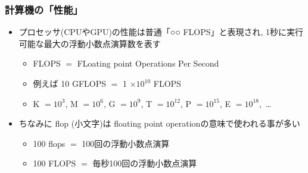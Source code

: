 \documentclass[10pt,dvipdfmx]{beamer}
\newcommand{\ao}[1]{{\color{blue}#1}}
\begin{document}
\begin{frame}
  \frametitle{計算機の「性能」}
  \begin{itemize}
  \item<1-> プロセッサ(CPUやGPU)の性能は普通\ao{「○○ FLOPS」}と表現され,
    1秒に実行可能な最大の\ao{浮動小数点演算数}を表す
    \begin{itemize}
    \item<2-> \ao{FLOPS} $=$ \ao{FL}oating point \ao{O}perations
      \ao{P}er \ao{S}econd
    \item<3-> 例えば 10 GFLOPS $=$ 1 $\times 10^{10}$ FLOPS
    \item<3->
      K $= 10^3$,
      M $= 10^6$,
      G $= 10^9$,
      T $= 10^{12}$,
      P $= 10^{15}$,
      E $= 10^{18},$ \ldots
    \end{itemize}
  \item<4-> ちなみに \ao{flop (小文字)}は
    \ao{floating point operation}の意味で使われる事が多い
    \begin{itemize}
    \item 100 flops $=$ 100回の浮動小数点演算
    \item 100 FLOPS $=$ 毎秒100回の浮動小数点演算
    \end{itemize}
  \end{itemize}
\end{frame}
\end{document}
